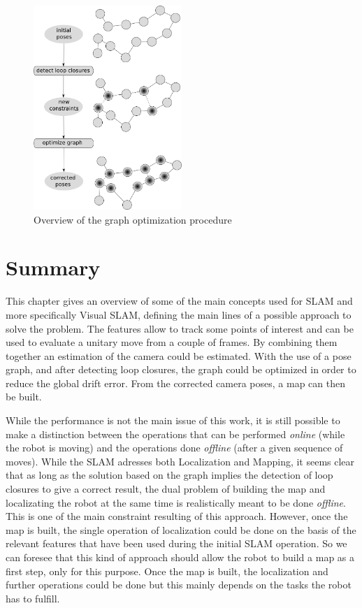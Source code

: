 \begin{figure}[h!]
\centering
\includegraphics[width=0.5\textwidth]{figures/graph1}
\caption{Overview of the graph optimization procedure}
\end{figure}

\section{Summary}

This chapter gives an overview of some of the main concepts used for SLAM and more specifically Visual SLAM, defining the main lines of a possible approach to solve the problem. The features allow to track some points of interest and can be used to evaluate a unitary move from a couple of frames. By combining them together an estimation of the camera could be estimated. With the use of a pose graph, and after detecting loop closures, the graph could be optimized in order to reduce the global drift error. From the corrected camera poses, a map can then be built. 

While the performance is not the main issue of this work, it is still possible to make a distinction between the operations that can be performed \emph{online} (while the robot is moving) and the operations done \emph{offline} (after a given sequence of moves). While the SLAM adresses both Localization and Mapping, it seems clear that as long as the solution based on the graph implies the detection of loop closures to give a correct result, the dual problem of building the map and localizating the robot at the same time is realistically meant to be done \emph{offline}. This is one of the main constraint resulting of this approach. However, once the map is built, the single operation of localization could be done on the basis of the relevant features that have been used during the initial SLAM operation. So we can foresee that this kind of approach should allow the robot to build a map as a first step, only for this purpose. Once the map is built, the localization and further operations could be done but this mainly depends on the tasks the robot has to fulfill.

